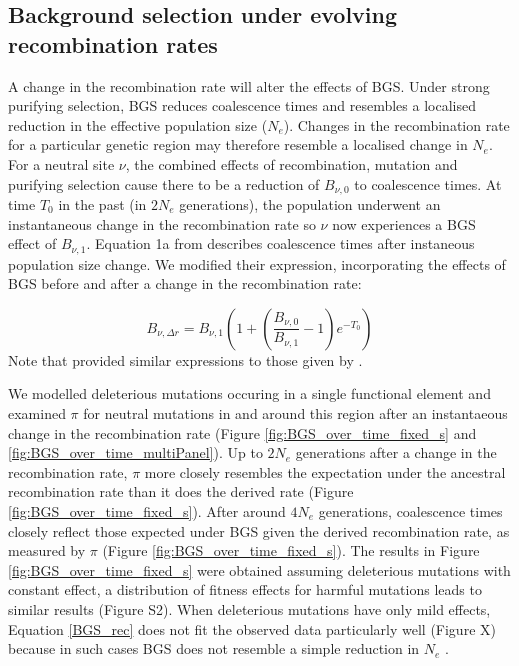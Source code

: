 \documentclass[11pt,twoside, onecolumn]{GSA_format}
\begin{document}
\subsection{Background selection under evolving recombination rates}

A change in the recombination rate will alter the effects of BGS. Under strong purifying selection, BGS reduces coalescence times and resembles a localised reduction in the effective population size ($N_e$). Changes in the recombination rate for a particular genetic region may therefore resemble a localised change in $N_e$. For a neutral site $\nu$, the combined effects of recombination, mutation and purifying selection cause there to be a reduction of $B_{\nu,0}$ to coalescence times. At time $T_0$ in the past (in $2N_e$ generations), the population underwent an instantaneous change in the recombination rate so $\nu$ now experiences a BGS effect of $B_{\nu,1}$. Equation 1a from \cite{Johri2020} describes coalescence times after instaneous population size change. We modified their expression, incorporating the effects of BGS before and after a change in the recombination rate:

\begin{equation}
B_{\nu,\Delta r} = B_{\nu,1} ( 1 + (\frac{B_{\nu,0}}{B_{\nu,1}} - 1)e^{-T_0})
\label{BGS_rec}
\end{equation}
\noindent
Note that \cite{Pool2007} provided similar expressions to those given by \cite{Johri2020}.

\vspace{5px}
 

We modelled deleterious mutations occuring in a single functional element and examined $\pi$ for neutral mutations in and around this region after an instantaeous change in the recombination rate (Figure \ref{fig:BGS_over_time_fixed_s} and \ref{fig:BGS_over_time_multiPanel}). Up to $2N_e$ generations after a change in the recombination rate, $\pi$ more closely resembles the expectation under the ancestral recombination rate than it does the derived rate (Figure \ref{fig:BGS_over_time_fixed_s}). After around $4N_e$ generations, coalescence times closely reflect those expected under BGS given the derived recombination rate, as measured by $\pi$ (Figure \ref{fig:BGS_over_time_fixed_s}). The results in Figure \ref{fig:BGS_over_time_fixed_s} were obtained assuming deleterious mutations with constant effect, a distribution of fitness effects for harmful mutations leads to similar results (Figure S2). When deleterious mutations have only mild effects, Equation \ref{BGS_rec} does not fit the observed data particularly well (Figure X) because in such cases BGS does not resemble a simple reduction in $N_e$ \citep{Good2014, Cvijovic2018}. 
\end{document}
